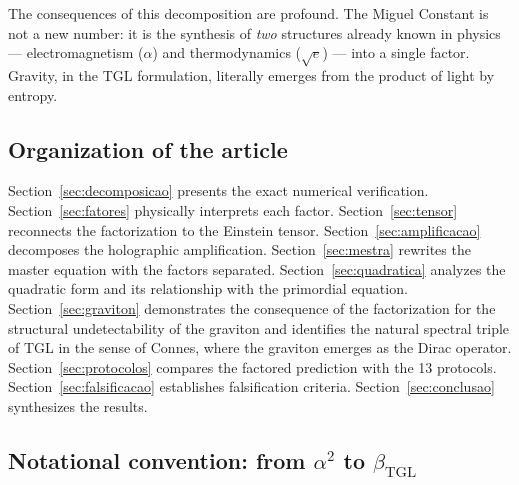 \documentclass[12pt,a4paper,twoside]{article}
\newcommand{\betatgl}{\beta_{\!\scriptscriptstyle\mathrm{TGL}}}
\begin{document}
The consequences of this decomposition are profound. The Miguel Constant is not a new number: it is the synthesis of \textit{two} structures already known in physics --- electromagnetism ($\alpha$) and thermodynamics ($\sqrt{e}$) --- into a single factor. Gravity, in the TGL formulation, literally emerges from the product of light by entropy.

\subsection{Organization of the article}

Section~\ref{sec:decomposicao} presents the exact numerical verification. Section~\ref{sec:fatores} physically interprets each factor. Section~\ref{sec:tensor} reconnects the factorization to the Einstein tensor. Section~\ref{sec:amplificacao} decomposes the holographic amplification. Section~\ref{sec:mestra} rewrites the master equation with the factors separated. Section~\ref{sec:quadratica} analyzes the quadratic form and its relationship with the primordial equation. Section~\ref{sec:graviton} demonstrates the consequence of the factorization for the structural undetectability of the graviton and identifies the natural spectral triple of TGL in the sense of Connes, where the graviton emerges as the Dirac operator. Section~\ref{sec:protocolos} compares the factored prediction with the 13 protocols. Section~\ref{sec:falsificacao} establishes falsification criteria. Section~\ref{sec:conclusao} synthesizes the results.


\subsection{Notational convention: from $\alpha^2$ to $\betatgl$}
\label{sec:convencao}
\end{document}

